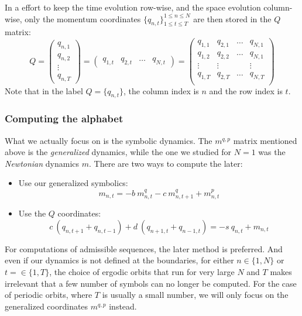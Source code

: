 In a effort to keep the time evolution row-wise, and the space evolution
column-wise, only the momentum coordinates $\{q_{n,t}\}^{1\leqslant n
\leqslant N}_{1 \leqslant t \leqslant T}$ are then stored in the $Q$
matrix:
\[
Q = \left( \begin{array}{c}
q_{n,1} \\
q_{n,2} \\
\vdots \\
q_{n,T}
\end{array} \right)
=
\left( \begin{array}{cccc}
q_{1,t} & q_{2,t} & \dots & q_{N,t}
\end{array} \right)
=
\left( \begin{array}{cccc}
q_{1,1} & q_{2,1} & \dots & q_{N,1} \\
q_{1,2} & q_{2,2} & \dots & q_{N,1} \\
\vdots & \vdots  & \: & \vdots \\
q_{1,T} & q_{2,T} & \dots & q_{N,T} \\
\end{array} \right)
\]
Note that in the label $Q = \{q_{n,t}\}$, the column index is $n$ and
the row index is $t$.

\subsubsection{Computing the alphabet}

What we actually focus on is the symbolic dynamics. The $m^{q,p}$ matrix
mentioned above is the \textit{generalized} dynamics, while the one we
studied for $N = 1$ was the \textit{Newtonian} dynamics $m$. There are
two ways to compute the later:
\begin{itemize}
\item
Use our generalized symbolics:
\[
m_{n,t} = -b \: m^q_{n,t} - c \: m^q_{n,t+1} + m^p_{n,t}
\]

\item
Use the $Q$ coordinates:
\[
c\:(q_{n,t+1} + q_{n,t-1}) + d\:(q_{n+1,t} + q_{n-1,t}) = -s \: q_{n,t} + m_{n,t}
\]
\end{itemize}

For computations of admissible sequences, the later method is preferred.
And even if our dynamics is not defined at the boundaries, for either $n
\in \{1, N\}$ or $t =\in \{1, T\}$, the choice of ergodic orbits that run
for very large $N$ and $T$ makes irrelevant that a few number of symbols
can no longer be computed. For the case of periodic orbits, where $T$ is
usually a small number, we will only focus on the generalized coordinates
$m^{q,p}$ instead.

